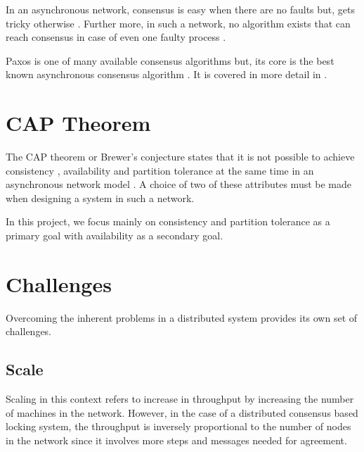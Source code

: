 In an asynchronous network, consensus is easy when there are no faults but, 
gets tricky otherwise \citep{Lampson:1996:HBH}. Further more, in such a network,
no algorithm exists that can reach consensus in case of even one faulty process
\citep{FisLynPat85}.

Paxos is one of many available consensus algorithms but, its core is the best
known asynchronous consensus algorithm \citep{Lampson:1996:HBH}. It is covered
in more detail in .

\section{CAP Theorem}

The CAP theorem or Brewer's conjecture states that it is not 
possible to achieve consistency%
, availability%
and partition tolerance%
at the same time in an asynchronous network model
\citep{journals/sigact/GilbertL02}. A choice of two of these attributes must
be made when designing a system in such a network.

In this project, we focus mainly on consistency and partition tolerance 
as a primary goal with availability as a secondary goal.

\section{Challenges}

Overcoming the inherent problems in a distributed system provides its own set of
challenges.

\subsection{Scale}

Scaling in this context refers to increase in throughput by increasing the
number of machines in the network. However, in the case of a distributed 
consensus based locking system, the throughput is inversely proportional to the
number of nodes in the network since it involves more steps and messages needed 
for agreement.


